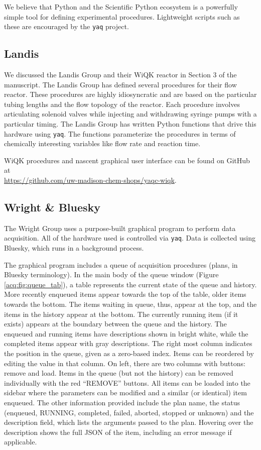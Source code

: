\documentclass[11pt, full]{article}
\newcommand\yaq{\texttt{yaq}}
\begin{document}
We believe that Python and the Scientific Python ecosystem is a powerfully simple tool for defining experimental procedures.
Lightweight scripts such as these are encouraged by the \yaq{} project.

\subsection{Landis}

We discussed the Landis Group and their WiQK reactor in Section 3 of the manuscript.
The Landis Group has defined several procedures for their flow reactor.
These procedures are highly idiosyncratic and are based on the particular tubing lengths and the flow topology of the reactor.
Each procedure involves articulating solenoid valves while injecting and withdrawing syringe pumps with a particular timing.
The Landis Group has written Python functions that drive this hardware using \yaq{}.
The functions parameterize the procedures in terms of chemically interesting variables like flow rate
and reaction time.

WiQK procedures and nascent graphical user interface can be found on GitHub at \\ \url{https://github.com/uw-madison-chem-shops/yaqc-wiqk}.

\subsection{Wright \& Bluesky}

The Wright Group uses a purpose-built graphical program to perform data acquisition.
All of the hardware used is controlled via \yaq{}.
Data is collected using Bluesky, which runs in a background process.

The graphical program includes a queue of acquisition procedures (plans, in Bluesky terminology).
In the main body of the queue window (Figure \ref{acq:fig:queue_tab}), a table represents the current state of the queue and history.
More recently enqueued items appear towards the top of the table, older items towards the bottom.
The items waiting in queue, thus, appear at the top, and the items in the history appear at the bottom.
The currently running item (if it exists) appears at the boundary between the queue and the history.
The enqueued and running items have descriptions shown in bright white, while the completed items appear with gray descriptions.
The right most column indicates the position in the queue, given as a zero-based index.
Items can be reordered by editing the value in that column.
On left, there are two columns with buttons: remove and load.
Items in the queue (but not the history) can be removed individually with the red ``REMOVE'' buttons.
All items can be loaded into the sidebar where the parameters can be modified and a similar (or identical) item enqueued.
The other information provided include the plan name, the status (enqueued, RUNNING, completed, failed, aborted, stopped or unknown) and the description field, which lists the arguments passed to the plan.
Hovering over the description shows the full JSON of the item, including an error message if applicable.
\end{document}
